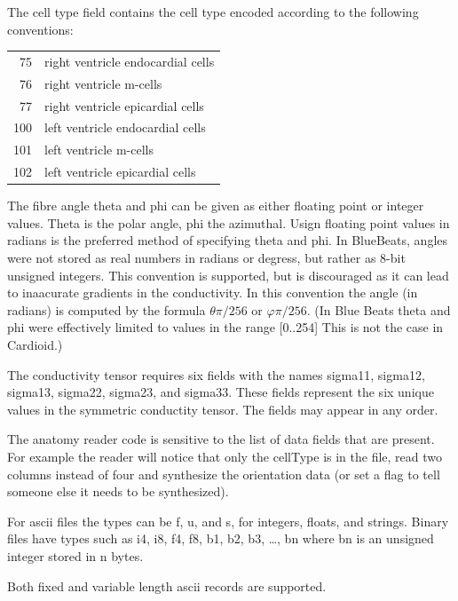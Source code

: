 \documentclass{article}
\begin{document}
The cell type field contains the cell type encoded according to the
following conventions:
\begin{center}
  \begin{tabular}{rl}
    75 & right ventricle endocardial cells\\
    76 & right ventricle m-cells\\
    77 & right ventricle epicardial cells\\
    100 & left ventricle endocardial cells\\
    101 & left ventricle m-cells\\
    102 & left ventricle epicardial cells\\
  \end{tabular}
\end{center}

The fibre angle theta and phi can be given as either floating point or
integer values.  Theta is the polar angle, phi the azimuthal.  Usign
floating point values in radians is the preferred method of specifying
theta and phi.  In BlueBeats, angles were not stored as real numbers in
radians or degress, but rather as 8-bit unsigned integers.  This
convention is supported, but is discouraged as it can lead to inaacurate
gradients in the conductivity.  In this convention the angle (in
radians) is computed by the formula $\theta\pi/256$ or $\varphi\pi/256$.
(In Blue Beats theta and phi were effectively limited to values in the
range [0..254] This is not the case in Cardioid.)


The conductivity tensor requires six
fields with the names sigma11, sigma12, sigma13, sigma22, sigma23, and
sigma33.  These fields represent the six unique values in the symmetric
conductity tensor.  The fields may appear in any order.


The anatomy reader code is sensitive to the list of data fields
that are present.  For example the reader will notice that only the
cellType is in the file, read two columns instead of four and synthesize
the orientation data (or set a flag to tell someone else it needs to be
synthesized).

For ascii files the types can be f, u, and s, for integers, floats, and
strings.  Binary files have types such as i4, i8, f4, f8, b1, b2, b3, \ldots,
bn where bn is an unsigned integer stored in n bytes.


Both fixed and variable length ascii records are supported.
\end{document}
